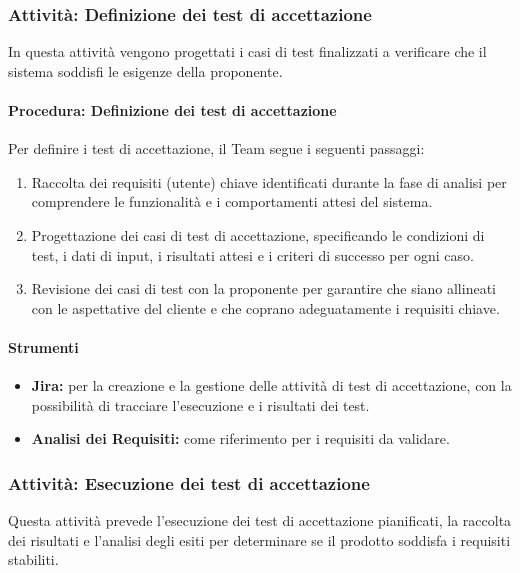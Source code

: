 \documentclass[a4paper,12pt]{article}
\begin{document}
\subsubsection{Attività: Definizione dei test di accettazione}
In questa attività vengono progettati i casi di test finalizzati a verificare
che il sistema soddisfi le esigenze della proponente.

\paragraph{Procedura: Definizione dei test di accettazione}
Per definire i test di accettazione, il Team segue i seguenti passaggi:
\begin{enumerate}
    \item Raccolta dei requisiti (utente) chiave identificati durante la fase di analisi per
          comprendere le funzionalità e i comportamenti attesi del sistema.
    \item Progettazione dei casi di test di accettazione, specificando le condizioni di
          test, i dati di input, i risultati attesi e i criteri di successo per ogni
          caso.
    \item Revisione dei casi di test con la proponente per garantire che siano allineati
          con le aspettative del cliente e che coprano adeguatamente i requisiti chiave.
\end{enumerate}

\paragraph{Strumenti}
\begin{itemize}
    \item \textbf{Jira:} per la creazione e la gestione delle attività di test di accettazione, con la possibilità di tracciare l'esecuzione e i risultati dei test.
    \item \textbf{Analisi dei Requisiti:} come riferimento per i requisiti da validare.
\end{itemize}

\subsubsection{Attività: Esecuzione dei test di accettazione}
Questa attività prevede l'esecuzione dei test di accettazione pianificati, la
raccolta dei risultati e l'analisi degli esiti per determinare se il prodotto
soddisfa i requisiti stabiliti.
\end{document}

